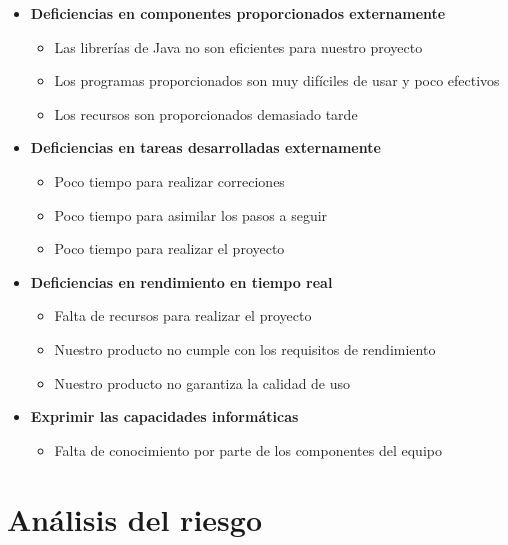 \documentclass[spanish,a4paper,11pt, twoside]{report}	%
\begin{document}
\begin{itemize}
\begin{itemize}
	\end{itemize}
\item \textbf {Deficiencias en componentes proporcionados externamente}
	\begin{itemize}
		\item {Las librerías de Java no son eficientes para nuestro proyecto}
		\item {Los programas proporcionados son muy difíciles de usar y poco efectivos}
		\item {Los recursos son proporcionados demasiado tarde}

	\end{itemize}
\item \textbf {Deficiencias en tareas desarrolladas externamente}
	\begin{itemize}
		\item {Poco tiempo para realizar correciones}
		\item {Poco tiempo para asimilar los pasos a seguir}
		\item {Poco tiempo para realizar el proyecto}
	\end{itemize}
\item \textbf {Deficiencias en rendimiento en tiempo real}
	\begin{itemize}
		\item {Falta de recursos para realizar el proyecto}
		\item {Nuestro producto no cumple con los requisitos de rendimiento}
		\item {Nuestro producto no garantiza la calidad de uso}
	\end{itemize}
\item \textbf {Exprimir las capacidades informáticas}
	\begin{itemize}
		\item {Falta de conocimiento por parte de los componentes del equipo}
	\end{itemize}
\end{itemize}


\newpage
\mbox{}
\thispagestyle{empty}						%
\newpage

\part{Análisis del riesgo}
\end{document}
